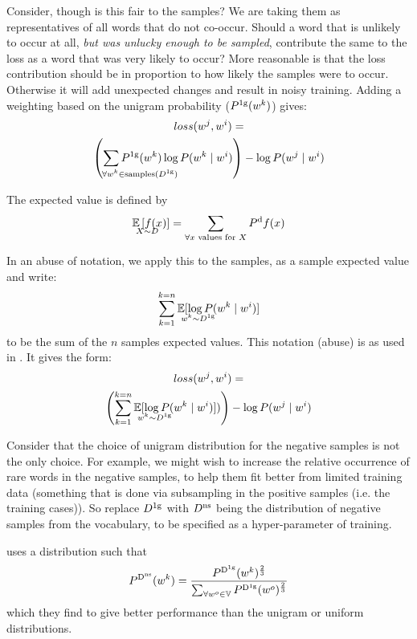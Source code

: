 \documentclass[parskip]{komatufte}
\begin{document}
Consider, though is this fair to the samples?
We are taking them as representatives of all words that do not co-occur.
Should a word that is unlikely to occur at all, \emph{but was unlucky enough to be sampled}, contribute the same to the loss as a word that was very likely to occur?
More reasonable is that the loss contribution should be in proportion to how likely the samples were to occur.
Otherwise it will add unexpected changes and result in noisy training.
Adding a weighting based on the unigram probability ($\d P_{1g}(\n w_k)$) gives:
%
\begin{multline}
loss(\n w_j,\n w_i) = \\
\left(\sum_{\mathrlap{\!\!\!\!\!\!\forall \n w_k \in \text{samples}(\d D_{1g})}}
\d P_{1g}(\n w_k) \log P(\n w_k\mid \n w_i) \right)
-\log P(\n w_j\mid \n w_i)
\end{multline}


The expected value is defined by
\begin{equation}
\expected_{X \sim D} \left[ f(x) \right]= \sum_{\text{$\forall x$ values for $X$}} \d P_d f(x)
\end{equation}

In an abuse of notation, we apply this to the samples, as a sample expected value and write:
\begin{equation}
	\sum_{k=1}^{k=n} \expected_{\n w_k \sim \d D_{1g}} [\log P(\n w_k\mid \n w_i)]
\end{equation}
to be the sum of the $n$ samples expected values.
This notation (abuse) is as used in .
It gives the form:
\begin{multline}
loss(\n w_j,\n w_i) = \\
\left(\sum_{k=1}^{k=n} \expected_{\n w_k \sim \d D_{1g}} [\log P(\n w_k\mid \n w_i)]) \right)
-\log P(\n w_j\mid \n w_i)
\end{multline}

Consider that the choice of unigram distribution for the negative samples is not the only choice.
For example, we might wish to increase the relative occurrence of rare words in the negative samples, to help them fit better from limited training data
(something that is done via subsampling in the positive samples (i.e. the training cases)).
So replace $\d D_{1g}$ with $\d D_{ns}$ being the distribution of negative samples from the vocabulary,
to be specified as a hyper-parameter of training.

\textcite{mikolovSkip} uses a distribution such that 
\begin{equation}
\d P_{\d D_{ns}}(\n w_k) =  \frac{\d P_{\d D_{1g}}(\n w_k)^{\frac{2}{3}}}{\sum_{\forall \n w_o\in \set{V}} \d P_{\d D_{1g}}(\n w_o)^{\frac{2}{3}}}
\end{equation}
which they find to give better performance than the unigram or uniform distributions.
\end{document}
